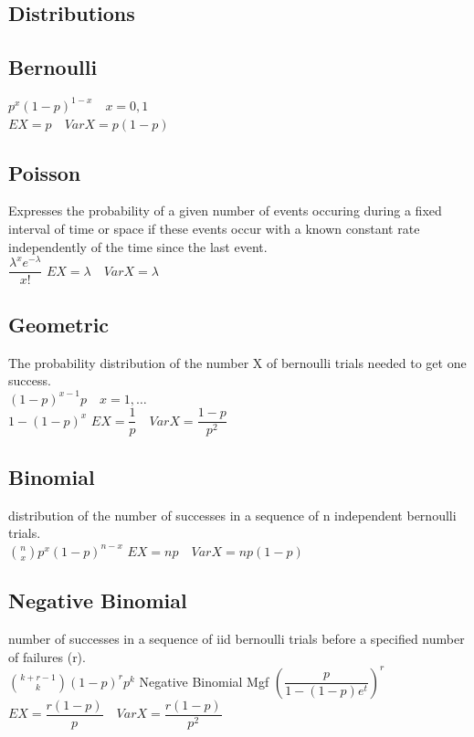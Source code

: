 \documentclass[openany]{book}
\begin{document}
\tableofcontents
\begin{flushleft}
\chapter{Distributions}
\section{Bernoulli}
$p^x(1-p)^{1-x} \quad x=0,1$\\
$EX=p \quad VarX=p(1-p)$
\section{Poisson}
Expresses the probability of a given number of events occuring during a fixed interval of time or space if these events occur with a known constant rate independently of the time since the last event.\\
$\dfrac{\lambda^x e^{-\lambda}}{x!}$\medbreak
$EX=\lambda \quad VarX= \lambda$
\section{Geometric}
The probability distribution of the number X of bernoulli trials needed to get one success.\\
$(1-p)^{x-1}p \quad x=1,\dots$\\
$1-(1-p)^x$\medbreak
$EX=\dfrac{1}{p} \quad VarX=\dfrac{1-p}{p^2}$
\section{Binomial}
distribution of the number of successes in a sequence of n independent bernoulli trials.\\
$\binom{n}{x} p^x(1-p)^{n-x}$ \medbreak
$EX=np \quad VarX=np(1-p)$
\section{Negative Binomial}
number of successes in a sequence of iid bernoulli trials before a specified number of failures (r).\\
$\binom{k+r-1}{k}(1-p)^r p^k$\medbreak
Negative Binomial Mgf $\left(\dfrac{p}{1-(1-p)e^t}\right)^r$\\
$EX=\dfrac{r(1-p)}{p} \quad VarX=\dfrac{r(1-p)}{p^2}$

\end{flushleft}
\end{document}

